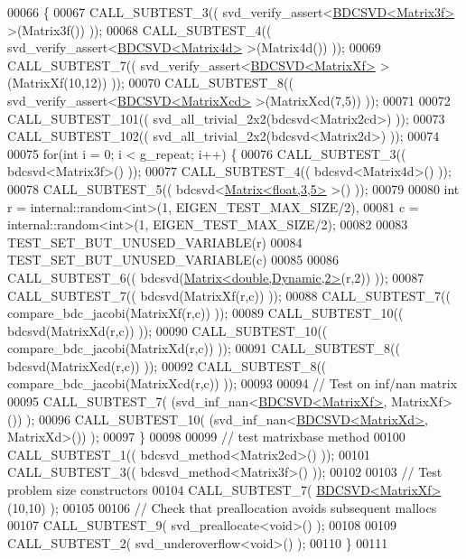 \begin{DoxyCode}
00066 \{
00067   CALL\_SUBTEST\_3(( svd\_verify\_assert<\hyperlink{group___s_v_d___module_class_eigen_1_1_b_d_c_s_v_d}{BDCSVD<Matrix3f>}  >(Matrix3f()) ));
00068   CALL\_SUBTEST\_4(( svd\_verify\_assert<\hyperlink{group___s_v_d___module_class_eigen_1_1_b_d_c_s_v_d}{BDCSVD<Matrix4d>}  >(Matrix4d()) ));
00069   CALL\_SUBTEST\_7(( svd\_verify\_assert<\hyperlink{group___s_v_d___module_class_eigen_1_1_b_d_c_s_v_d}{BDCSVD<MatrixXf>}  >(MatrixXf(10,12)) ));
00070   CALL\_SUBTEST\_8(( svd\_verify\_assert<\hyperlink{group___s_v_d___module_class_eigen_1_1_b_d_c_s_v_d}{BDCSVD<MatrixXcd>} >(MatrixXcd(7,5)) ));
00071   
00072   CALL\_SUBTEST\_101(( svd\_all\_trivial\_2x2(bdcsvd<Matrix2cd>) ));
00073   CALL\_SUBTEST\_102(( svd\_all\_trivial\_2x2(bdcsvd<Matrix2d>) ));
00074 
00075   \textcolor{keywordflow}{for}(\textcolor{keywordtype}{int} i = 0; i < g\_repeat; i++) \{
00076     CALL\_SUBTEST\_3(( bdcsvd<Matrix3f>() ));
00077     CALL\_SUBTEST\_4(( bdcsvd<Matrix4d>() ));
00078     CALL\_SUBTEST\_5(( bdcsvd<\hyperlink{group___core___module_class_eigen_1_1_matrix}{Matrix<float,3,5>} >() ));
00079 
00080     \textcolor{keywordtype}{int} r = internal::random<int>(1, EIGEN\_TEST\_MAX\_SIZE/2),
00081         c = internal::random<int>(1, EIGEN\_TEST\_MAX\_SIZE/2);
00082     
00083     TEST\_SET\_BUT\_UNUSED\_VARIABLE(r)
00084     TEST\_SET\_BUT\_UNUSED\_VARIABLE(c)
00085     
00086     CALL\_SUBTEST\_6((  bdcsvd(\hyperlink{group___core___module_class_eigen_1_1_matrix}{Matrix<double,Dynamic,2>}(r,2)) ));
00087     CALL\_SUBTEST\_7((  bdcsvd(MatrixXf(r,c)) ));
00088     CALL\_SUBTEST\_7((  compare\_bdc\_jacobi(MatrixXf(r,c)) ));
00089     CALL\_SUBTEST\_10(( bdcsvd(MatrixXd(r,c)) ));
00090     CALL\_SUBTEST\_10(( compare\_bdc\_jacobi(MatrixXd(r,c)) ));
00091     CALL\_SUBTEST\_8((  bdcsvd(MatrixXcd(r,c)) ));
00092     CALL\_SUBTEST\_8((  compare\_bdc\_jacobi(MatrixXcd(r,c)) ));
00093 
00094     \textcolor{comment}{// Test on inf/nan matrix}
00095     CALL\_SUBTEST\_7(  (svd\_inf\_nan<\hyperlink{group___s_v_d___module_class_eigen_1_1_b_d_c_s_v_d}{BDCSVD<MatrixXf>}, MatrixXf>()) );
00096     CALL\_SUBTEST\_10( (svd\_inf\_nan<\hyperlink{group___s_v_d___module_class_eigen_1_1_b_d_c_s_v_d}{BDCSVD<MatrixXd>}, MatrixXd>()) );
00097   \}
00098 
00099   \textcolor{comment}{// test matrixbase method}
00100   CALL\_SUBTEST\_1(( bdcsvd\_method<Matrix2cd>() ));
00101   CALL\_SUBTEST\_3(( bdcsvd\_method<Matrix3f>() ));
00102 
00103   \textcolor{comment}{// Test problem size constructors}
00104   CALL\_SUBTEST\_7( \hyperlink{group___s_v_d___module_class_eigen_1_1_b_d_c_s_v_d}{BDCSVD<MatrixXf>}(10,10) );
00105 
00106   \textcolor{comment}{// Check that preallocation avoids subsequent mallocs}
00107   CALL\_SUBTEST\_9( svd\_preallocate<void>() );
00108 
00109   CALL\_SUBTEST\_2( svd\_underoverflow<void>() );
00110 \}
00111 
\end{DoxyCode}
